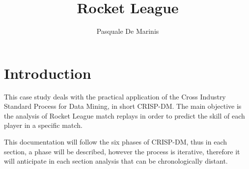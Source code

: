 \documentclass[
	12pt, %
]{fphw}
\title{Rocket League}
\author{Pasquale De Marinis}
\institute{University of Bari \\ Department of Computer Science} %
\begin{document}
\maketitle
\tableofcontents\newpage

\section{Introduction}

This case study deals with the practical application of the Cross Industry Standard Process for Data Mining, in short CRISP-DM. The main objective is the analysis of Rocket League match replays in order to predict the skill of each player in a specific match.

This documentation will follow the six phases of CRISP-DM, thus in each section, a phase will be described, however the process is iterative, therefore it will anticipate in each section analysis that can be chronologically distant.



\newpage

\end{document}
